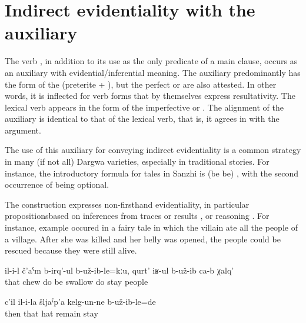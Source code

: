 
\section{Indirect evidentiality with the auxiliary \protect{} \protect{}}
\label{sec:Indirect evidentiality with the auxiliary b-uz be, be at, stay, remain}

The verb  , in addition to its use as the only predicate of a main clause, occurs as an auxiliary with evidential\slash inferential meaning. The auxiliary predominantly has the form of the  (preterite + ), but the perfect or  are also attested. In other words, it is inflected for verb forms that by themselves express resultativity. The lexical verb appears in the form of the imperfective or . The alignment of the auxiliary is identical to that of the lexical verb, that is, it agrees in  with the  argument.

The use of this auxiliary for conveying indirect evidentiality is a common strategy in many (if not all) Dargwa varieties, especially in traditional stories. For instance, the introductory formula for tales in Sanzhi is  (be  be) , with the second occurrence of  being optional.

The construction expresses non-firsthand evidentiality, in particular propositions\linebreak based on inferences from traces or results ,  or reasoning . For instance, example  occured in a fairy tale in which the villain ate all the people of a village. After she was killed and her belly was opened, the people could be rescued because they were still alive.

\begin{exe}
	\ex	\label{ex:(It turned out that) she did not chew the people, but swallowed them@13}
	\gll	il-i-l	č'aˁm	b-irq'-ul	b-už-ib-le=kːu,	qurt' 	iʁ-ul	b-už-ib ca-b	χalq'\\
		that	chew	do	be	swallow	do	stay  people\\
	\glt	{}

	\ex	\label{ex:Then (apparently) his hat remained there@14}
	\gll	c'il	il-i-la	šljaˁp'a	kelg-un-ne	b-už-ib-le=de\\
		then	that	hat	remain	stay\\
	\glt	{}
\end{exe}

